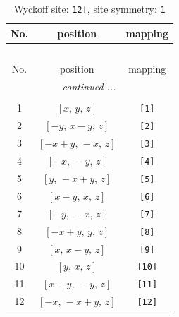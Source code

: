 \documentclass[fleqn,8pt]{jsarticle}
\begin{document}
\begin{longtable}{ccc}
\caption{Wyckoff site: {\tt 12f}, site symmetry: {\tt 1}}
 \\
 \hline \hline
No. & position & mapping \\ \hline \endfirsthead

\multicolumn{2}{l}{\tablename\ \thetable{}} \\
 \hline \hline
No. & position & mapping \\ \hline \endhead

 \hline \hline
\multicolumn{2}{r}{\footnotesize\it continued ...} \\ \endfoot

 \hline \hline
\multicolumn{2}{r}{} \\ \endlastfoot

1 & $\left[ x,\, y,\, z \right]$ & {\tt [1]} \\ \hline
2 & $\left[ - y,\, x - y,\, z \right]$ & {\tt [2]} \\ \hline
3 & $\left[ - x + y,\, - x,\, z \right]$ & {\tt [3]} \\ \hline
4 & $\left[ - x,\, - y,\, z \right]$ & {\tt [4]} \\ \hline
5 & $\left[ y,\, - x + y,\, z \right]$ & {\tt [5]} \\ \hline
6 & $\left[ x - y,\, x,\, z \right]$ & {\tt [6]} \\ \hline
7 & $\left[ - y,\, - x,\, z \right]$ & {\tt [7]} \\ \hline
8 & $\left[ - x + y,\, y,\, z \right]$ & {\tt [8]} \\ \hline
9 & $\left[ x,\, x - y,\, z \right]$ & {\tt [9]} \\ \hline
10 & $\left[ y,\, x,\, z \right]$ & {\tt [10]} \\ \hline
11 & $\left[ x - y,\, - y,\, z \right]$ & {\tt [11]} \\ \hline
12 & $\left[ - x,\, - x + y,\, z \right]$ & {\tt [12]} \\
\end{longtable}
\end{document}
